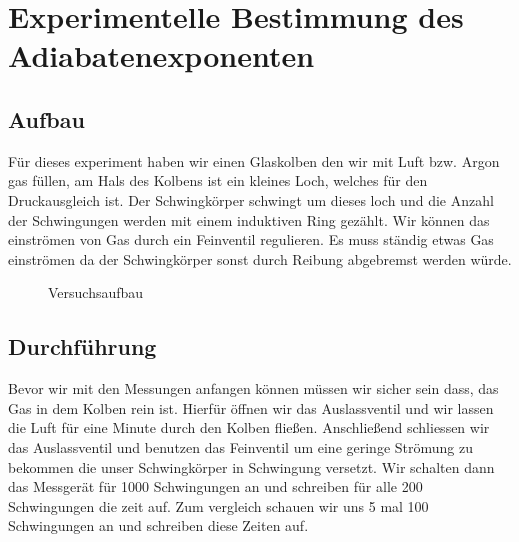 \documentclass[11pt,a4paper]{article}
\begin{document}
\section{Experimentelle Bestimmung des Adiabatenexponenten}
\subsection{Aufbau}

Für dieses experiment haben wir einen Glaskolben den wir mit Luft bzw. Argon gas füllen, am Hals des Kolbens ist ein kleines Loch, welches für den Druckausgleich ist. Der Schwingkörper schwingt um dieses loch und die Anzahl der Schwingungen werden mit einem induktiven Ring gezählt. Wir können das einströmen von Gas durch ein Feinventil regulieren. Es muss ständig etwas Gas einströmen da der Schwingkörper sonst durch Reibung abgebremst werden würde.  

\begin{figure}[h]
\centering
{}
   \renewcommand\thefigure{B1}
\caption[Versuchsaufbau]{Versuchsaufbau \cite{Anleitung}}
\label{JS1}
\end{figure}

\subsection{Durchführung}

Bevor wir mit den Messungen anfangen können müssen wir sicher sein dass, das Gas in dem Kolben rein ist. Hierfür öffnen wir das Auslassventil und wir lassen die Luft für eine Minute durch den Kolben fließen. Anschließend schliessen wir das Auslassventil und benutzen das Feinventil um eine geringe Strömung zu bekommen die unser Schwingkörper in Schwingung versetzt. Wir schalten dann das Messgerät für 1000 Schwingungen an und schreiben für alle 200 Schwingungen die zeit auf. Zum vergleich schauen wir uns 5 mal 100 Schwingungen an und schreiben diese Zeiten auf. 
\end{document}
